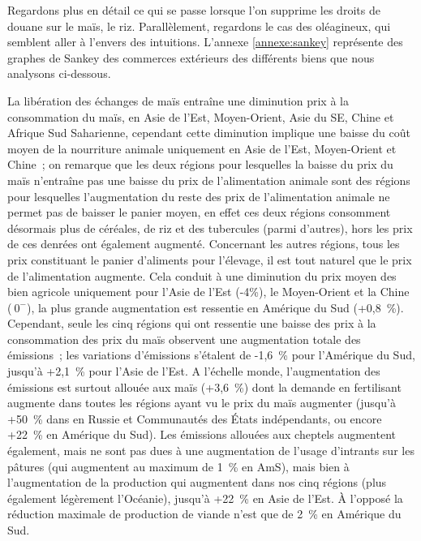 Regardons plus en détail ce qui se passe lorsque l'on supprime les droits de douane sur le maïs, le riz. Parallèlement, regardons le cas des oléagineux, qui semblent aller à l'envers des intuitions. L'annexe \ref{annexe:sankey} représente des graphes de Sankey des commerces extérieurs des différents biens que nous analysons ci-dessous.

La libération des échanges de maïs entraîne une diminution prix à la consommation du maïs, en Asie de l'Est, Moyen-Orient, Asie du SE, Chine et Afrique Sud Saharienne, cependant cette diminution implique une baisse du coût moyen de la nourriture animale uniquement en Asie de l'Est, Moyen-Orient et Chine~; on remarque que les deux régions pour lesquelles la baisse du prix du maïs n'entraîne pas une baisse du prix de l'alimentation animale sont des régions pour lesquelles l'augmentation du reste des prix de l'alimentation animale ne permet pas de baisser le panier moyen, en effet ces deux régions consomment désormais plus de céréales, de riz et des tubercules (parmi d'autres), hors les prix de ces denrées ont également augmenté. Concernant les autres régions, tous les prix constituant le panier d'aliments pour l'élevage, il est tout naturel que le prix de l'alimentation augmente. Cela conduit à une diminution du prix moyen des bien agricole uniquement pour l'Asie de l'Est (-4\%), le Moyen-Orient et la Chine ($~0^-$), la plus grande augmentation est ressentie en Amérique du Sud (+0,8~\%). Cependant, seule les cinq régions qui ont ressentie une baisse des prix à la consommation des prix du maïs observent une augmentation totale des émissions~; les variations d'émissions s’étalent de -1,6~\% pour l'Amérique du Sud, jusqu'à +2,1~\% pour l'Asie de l'Est. A l'échelle monde, l'augmentation des émissions est surtout allouée aux maïs (+3,6~\%) dont la demande en fertilisant augmente dans toutes les régions ayant vu le prix du maïs augmenter (jusqu'à +50~\% dans en Russie et Communautés des États indépendants, ou encore +22~\% en Amérique du Sud). Les émissions allouées aux cheptels augmentent également, mais ne sont pas dues à une augmentation de l'usage d'intrants sur les pâtures (qui augmentent au maximum de 1~\% en AmS), mais bien à l'augmentation de la production qui augmentent dans nos cinq régions (plus également légèrement l'Océanie), jusqu'à +22~\% en Asie de l'Est. À l'opposé la réduction maximale de production de viande n'est que de 2~\% en Amérique du Sud.


